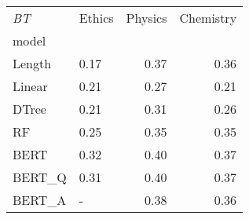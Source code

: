 \begin{tabular}{llrr}
\toprule
\textit{BT} & Ethics &  Physics &  Chemistry \\
model  &        &          &            \\
\midrule
Length &   0.17 &     0.37 &       0.36 \\
Linear &   0.21 &     0.27 &       0.21 \\
DTree  &   0.21 &     0.31 &       0.26 \\
RF     &   0.25 &     0.35 &       0.35 \\
BERT   &   0.32 &     0.40 &       0.37 \\
BERT\_Q &   0.31 &     0.40 &       0.37 \\
BERT\_A &      - &     0.38 &       0.36 \\
\bottomrule
\end{tabular}

